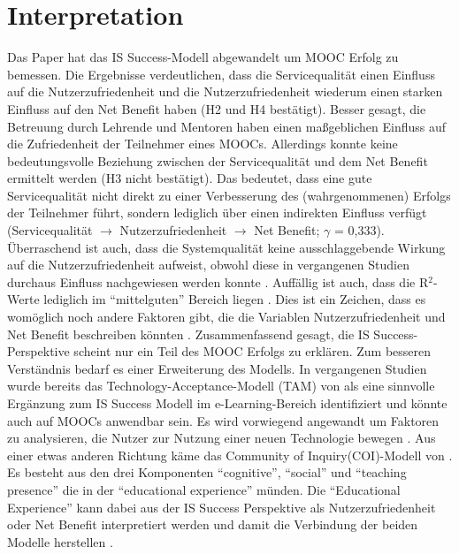 \section{Interpretation}
\label{sec:vergleich}
Das Paper hat das IS Success-Modell abgewandelt um MOOC Erfolg zu bemessen.  
Die Ergebnisse verdeutlichen, dass die Servicequalität einen Einfluss auf die Nutzerzufriedenheit und die Nutzerzufriedenheit wiederum einen starken Einfluss auf den Net Benefit haben (H2 und H4 bestätigt). Besser gesagt, die Betreuung durch Lehrende und Mentoren haben einen maßgeblichen Einfluss auf die Zufriedenheit der Teilnehmer eines MOOCs. Allerdings konnte keine bedeutungsvolle Beziehung zwischen der Servicequalität und dem Net Benefit ermittelt werden (H3 nicht bestätigt). Das bedeutet, dass eine gute Servicequalität nicht direkt zu einer Verbesserung des (wahrgenommenen) Erfolgs der Teilnehmer führt, sondern lediglich über einen indirekten Einfluss verfügt (Servicequalität $\rightarrow$ Nutzerzufriedenheit $\rightarrow$ Net Benefit; $\gamma$ = 0,333). Überraschend ist auch, dass die Systemqualität keine ausschlaggebende Wirkung auf die Nutzerzufriedenheit aufweist, obwohl diese in vergangenen Studien durchaus Einfluss nachgewiesen werden konnte \parencite{freeze2010success, islam2013investigating, mohammadi2015factors}. 
Auffällig ist auch, dass die R$^2$-Werte lediglich im "`mittelguten"' Bereich liegen \parencite[vgl.][S.323]{chin1998partial}. Dies ist ein Zeichen, dass es womöglich noch andere Faktoren gibt, die die Variablen Nutzerzufriedenheit und Net Benefit beschreiben könnten \parencite[vgl.][S.179]{freeze2010success}.  
Zusammenfassend gesagt, die IS Success-Perspektive scheint nur ein Teil des MOOC Erfolgs zu erklären. Zum besseren Verständnis bedarf es einer Erweiterung des Modells. In vergangenen Studien wurde bereits das Technology-Acceptance-Modell (TAM) von \textcite{bagozzi1992development} als eine sinnvolle Ergänzung zum IS Success Modell im e-Learning-Bereich identifiziert \parencite{mohammadi2015factors} und könnte auch auf MOOCs anwendbar sein. Es wird vorwiegend angewandt um Faktoren zu analysieren, die Nutzer zur Nutzung einer neuen Technologie bewegen \parencite[vgl.][S.702]{mohammadi2015factors}.  
Aus einer etwas anderen Richtung käme das Community of Inquiry(COI)-Modell von \textcite{garrison1999critical}. Es besteht aus den drei Komponenten "`cognitive"',  "`social"' und "`teaching presence"' die in der "`educational experience"'  münden. Die "`Educational Experience"' kann dabei aus der IS Success Perspektive als Nutzerzufriedenheit oder Net Benefit interpretiert werden und damit die Verbindung der beiden Modelle herstellen \parencite[vgl.][S.179]{freeze2010success}.

